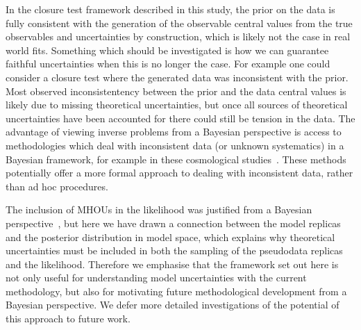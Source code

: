 In the closure test framework described in this study, the prior on the data is
fully consistent with the generation of the observable central values from the
true observables and uncertainties by construction, which is likely not the case
in real world fits. Something which should be investigated is how we can
guarantee faithful uncertainties when this is no longer the case. For example
one could consider a closure test where the generated data was inconsistent with
the prior. Most observed inconsistentency between the prior and the data central
values is likely due to missing theoretical uncertainties, but once all sources
of theoretical uncertainties have been accounted for there could still be
tension in the data. The advantage of viewing inverse problems from a Bayesian
perspective is access to methodologies which deal with inconsistent data (or
unknown systematics) in a Bayesian framework, for example in these cosmological
studies~\cite{Luis_Bernal_2018, Hobson_2002}. These methods potentially offer a
more formal approach to dealing with inconsistent data, rather than ad hoc
procedures.

The inclusion of MHOUs in the likelihood was justified from a Bayesian
perspective~\cite{AbdulKhalek:2019ihb}, but here we have drawn a connection
between the model replicas and the posterior distribution in model space, which
explains why theoretical uncertainties must be included in both the sampling of
the pseudodata replicas and the likelihood. Therefore we emphasise that the
framework set out here is not only useful for understanding model uncertainties
with the current methodology, but also for motivating future methodological
development from a Bayesian perspective. We defer more detailed investigations
of the potential of this approach to future work. 

